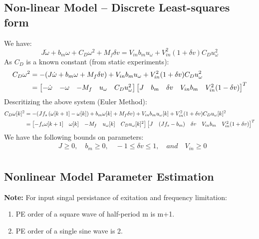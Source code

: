 \subsection{Non-linear Model -- Discrete Least-squares form}
We have:
$$J \dot \omega + b_m \omega + C_D \omega^2 + M_f \delta v = V_{in} b_m u_\omega + V_{in}^2 (1 + \delta v) C_D u_\omega^2$$
As $C_D$ is a known constant (from static experiments):
\begin{align*}
    C_D \omega^2 &= -(J \dot \omega + b_m \omega + M_f \delta v) + V_{in} b_m u_\omega + V_{in}^2 (1 + \delta v) C_D u_\omega^2\\
    &= \begin{bmatrix} -\dot \omega & -\omega & -M_f & u_\omega & C_D u_\omega ^2 \end{bmatrix} \begin{bmatrix} J & b_m & \delta v & V_{in} b_m & V_{in}^2 (1 - \delta v) \end{bmatrix}^T
\end{align*}
Descritizing the above system (Euler Method):
\begin{align*}
    C_D \omega[k]^2 &= -(Jf_s \left( \omega[k+1]-\omega[k] \right) + b_m \omega[k] + M_f \delta v) + V_{in} b_m u_\omega[k] + V_{in}^2 (1 + \delta v) C_D u_\omega[k]^2\\
    &=\begin{bmatrix} -f_s \omega[k+1] & \omega[k] & -M_f & u_\omega[k] & C_D u_\omega[k]^2 \end{bmatrix}\begin{bmatrix} J & (J f_s - b_m) & \delta v & V_{in} b_m & V_{in}^2 (1 + \delta v) \end{bmatrix}^T
\end{align*}
We have the following bounds on parameters:
\begin{align*}
    &J \geq 0, \quad b_m \geq 0, \quad -1 \leq \delta v \leq 1, \quad and \quad V_{in} \geq 0\\
\end{align*}



\subsection{Nonlinear Model Parameter Estimation}

\textbf{Note:} For input singal persistance of exitation and frequency limitation:
\begin{enumerate}
   \item PE order of a square wave of half-period m is m+1.
   \item PE order of a single sine wave is 2.
\end{enumerate}
